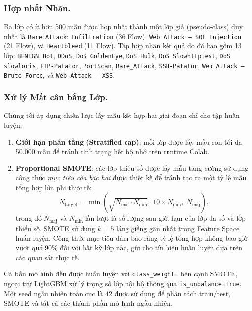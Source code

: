 \subsubsection*{Hợp nhất Nhãn.}
Ba lớp có ít hơn 500 mẫu được hợp nhất thành một lớp giả (pseudo-class) duy nhất là \texttt{Rare\_Attack}: \texttt{Infiltration} (36 Flow), \texttt{Web Attack -- SQL Injection} (21 Flow), và \texttt{Heartbleed} (11 Flow). Tập hợp nhãn kết quả do đó bao gồm 13 lớp: \texttt{BENIGN}, \texttt{Bot}, \texttt{DDoS}, \texttt{DoS GoldenEye}, \texttt{DoS Hulk}, \texttt{DoS Slowhttptest}, \texttt{DoS slowloris}, \texttt{FTP-Patator}, \texttt{PortScan}, \texttt{Rare\_Attack}, \texttt{SSH-Patator}, \texttt{Web Attack -- Brute Force}, và \texttt{Web Attack -- XSS}.

\subsubsection*{Xử lý Mất cân bằng Lớp.}
Chúng tôi áp dụng chiến lược lấy mẫu kết hợp hai giai đoạn chỉ cho tập huấn luyện:

\begin{enumerate}
    \item \textbf{Giới hạn phân tầng (Stratified cap)}: mỗi lớp được lấy mẫu con tối đa 50.000 mẫu để tránh tình trạng hết bộ nhớ trên runtime Colab.
    \item \textbf{Proportional SMOTE}: các lớp thiểu số được lấy mẫu tăng cường sử dụng công thức \emph{mục tiêu căn bậc hai} được thiết kế để tránh tạo ra một tỷ lệ mẫu tổng hợp lớn phi thực tế:
    \begin{equation}
        N_{\text{target}} = \min\!\left(\sqrt{N_{\text{maj}} \cdot N_{\text{min}}},\; 10 \times N_{\text{min}},\; N_{\text{maj}}
\right),
    \end{equation}
    trong đó $N_{\text{maj}}$ và $N_{\text{min}}$ lần lượt là số lượng sau giới hạn của lớp đa số và lớp thiểu số. SMOTE sử dụng $k=5$ láng giềng gần nhất trong Feature Space huấn luyện. Công thức mục tiêu đảm bảo rằng tỷ lệ tổng hợp không bao giờ vượt quá $90\%$ đối với bất kỳ lớp nào, giữ cho tín hiệu huấn luyện dựa trên các quan sát thực tế.
\end{enumerate}

\noindent Cả bốn mô hình đều được huấn luyện với \texttt{class\_weight=} bên cạnh SMOTE, ngoại trừ LightGBM xử lý trọng số lớp nội bộ thông qua \texttt{is\_unbalance=True}. Một seed ngẫu nhiên toàn cục là $42$ được sử dụng để phân tách train/test, SMOTE và tất cả các thành phần mô hình ngẫu nhiên.
